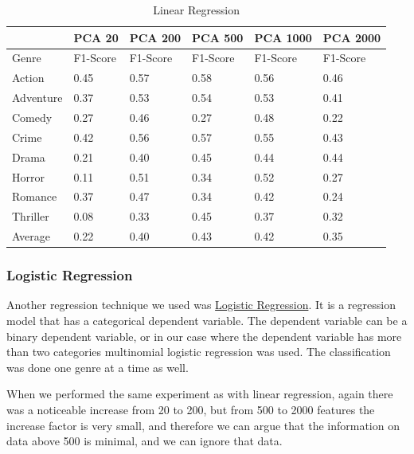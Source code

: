 \documentclass[11pt]{article}
\begin{document}
\begin{table}[h]
	\label{tab:lr_scores}
\begin{center}
	\begin{tabular}{| l | l | l | l | l | l |}
		\hline		         
                  & PCA 20    & PCA 200           & PCA 500     & PCA 1000  & PCA 2000 \\\hline
        Genre     & F1-Score  & F1-Score          & F1-Score    & F1-Score  & F1-Score\\\hline		
	  	Action    & 0.45      & 0.57 			  & 0.58        & 0.56      &  0.46\\
		Adventure & 0.37      & 0.53 			  & 0.54        & 0.53      &  0.41\\
		Comedy    & 0.27      & 0.46 			  & 0.27        & 0.48      &  0.22\\
		Crime     & 0.42      & 0.56 			  & 0.57        & 0.55      &  0.43\\
		Drama     & 0.21      & 0.40 			  & 0.45        & 0.44      &  0.44\\
		Horror    & 0.11      & 0.51 			  & 0.34        & 0.52      &  0.27\\
		Romance   & 0.37      & 0.47 			  & 0.34        & 0.42      &  0.24\\ 
		Thriller  & 0.08      & 0.33 			  & 0.45        & 0.37      &  0.32\\\hline
		Average   & 0.22      & 0.40 			  & 0.43        & 0.42      &  0.35\\\hline       
	\end{tabular} 
\end{center}
	\caption{Linear Regression}
\end{table}


\subsubsection{Logistic Regression}

Another regression technique we used was \href{https://en.wikipedia.org/wiki/Logistic_regression}{Logistic Regression}. It is a regression model that has a categorical dependent variable. The dependent variable can be a binary dependent variable, or in our case where the dependent variable has more than two categories multinomial logistic regression was used. The classification was done one genre at a time as well.

When we performed the same experiment as with linear regression, again there was a noticeable increase from 20 to 200, but from 500 to 2000 features the increase factor is very small, and therefore we can argue that the information on data above 500 is minimal, and we can ignore that data.
\end{document}
